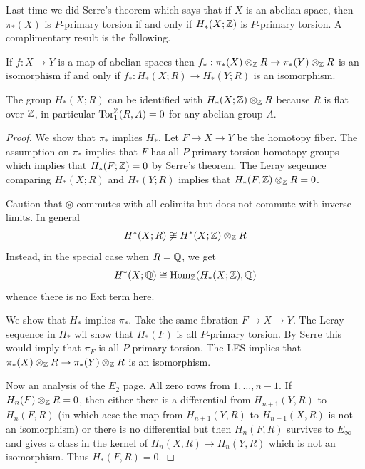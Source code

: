 \documentclass[12pt]{article}
\begin{document}
Last time we did Serre's theorem which says that if $X$ is an abelian space, then $\pi_*(X)$ is $P$-primary torsion if and only if $H_*(X;\mathbb{Z})$ is $P$-primary torsion. A complimentary result is the following.
\begin{theorem}
    If $f:X\to Y$ is a map of abelian spaces then $f_*:\pi_*(X)\otimes_{\mathbb{Z}} R \to \pi_*(Y)\otimes_{\mathbb{Z}} R$ is an isomorphism if and only if $f_*:H_*(X;R) \to H_*(Y;R)$ is an isomorphism.
\end{theorem}
The group $H_*(X;R)$ can be identified with $H_*(X;\mathbb{Z})\otimes_{\mathbb{Z}} R$ because $R$ is flat over $\mathbb{Z}$, in particular $\operatorname{Tor}_1^{\mathbb{Z}}(R,A) = 0$ for any abelian group $A$.
\begin{proof}
    We show that $\pi_*$ implies $H_*$. Let $F \to X \to Y$ be the homotopy fiber. The assumption on $\pi_*$ implies that $F$ has all $P$-primary torsion homotopy groups which implies that $H_*(F;\mathbb{Z}) = 0$ by Serre's theorem. The Leray seqeunce comparing $H_*(X;R)$ and $H_*(Y;R)$ implies that $H_*(F,\mathbb{Z}) \otimes_{\mathbb{Z}} R = 0$. 
    
    Caution that $\otimes$ commutes with all colimits but does not commute with inverse limits. In general\begin{align*}
        H^*(X;R) \not\cong H^*(X;\mathbb{Z})\otimes_{\mathbb{Z}} R
    \end{align*} Instead, in the special case when $R = \mathbb{Q}$, we get \begin{align*}
        H^*(X;\mathbb{Q}) \cong \operatorname{Hom}_{\mathbb{Z}}(H_*(X;\mathbb{Z}),\mathbb{Q}) 
    \end{align*} whence there is no Ext term here.

We show that $H_*$ implies $\pi_*$. Take the same fibration $F \to X \to Y$. The Leray sequence in $H_*$ wil show that $H_*(F)$ is all $P$-primary torsion. 
By Serre this would imply that $\pi_F$ is all $P$-primary torsion. The LES implies that $\pi_*(X)\otimes_{\mathbb{Z}} R \to \pi_*(Y)\otimes_{\mathbb{Z}} R$ is an isomorphism.

Now an analysis of the $E_2$ page. All zero rows from $1,\dots,n-1$. If $H_n(F) \otimes_{\mathbb{Z}} R = 0$, then either there is a differential from $H_{n+1}(Y,R)$ to $H_n(F,R)$ (in which acse the map from $H_{n+1}(Y,R)$ to $H_{n+1}(X,R)$ is not an isomorphism) or there is no differential but then $H_n(F,R)$ survives to $E_\infty$ and gives a class in the kernel of $H_n(X,R) \to H_n(Y,R)$ which is not an isomorphism. Thus $H_*(F,R) = 0$.
\end{proof}
\end{document}
